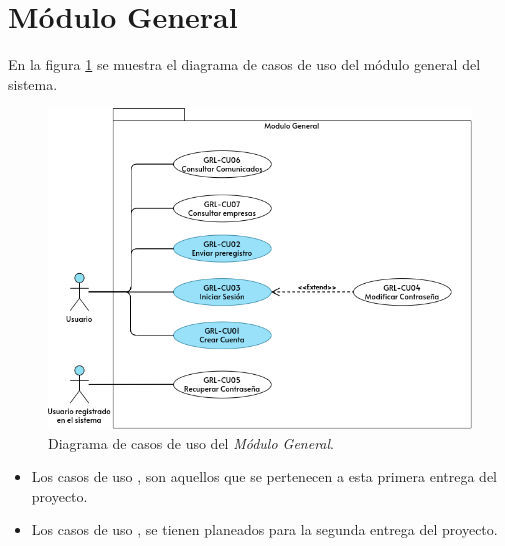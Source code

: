 \section{Módulo General}
	En la figura \ref{adcu:grl} se muestra el diagrama de casos de uso del módulo general del sistema.

	\begin{figure}[hbtp!]
		\begin{center}
			\includegraphics[width=.8\textwidth]{sprints/imagenes/CUGRL.png}
		\end{center}
		
		\caption{Diagrama de casos de uso del \textit{Módulo General}.}
		\label{adcu:grl}
	\end{figure}

	\begin{itemize}
        \item Los casos de uso \IUazul{} , son aquellos que se pertenecen a esta primera entrega del proyecto.
        \item Los casos de uso \IUblanco{}, se tienen planeados para la segunda entrega del proyecto.
    \end{itemize} 

	
	

	
	

	
	

